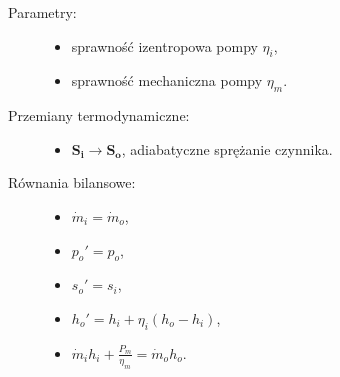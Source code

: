 \begin{description}

	\item[Parametry:] \hfill

		\begin{itemize}

			\item sprawność izentropowa pompy $\eta_i$,

			\item sprawność mechaniczna pompy $\eta_m$.

		\end{itemize}

	\item[Przemiany termodynamiczne:] \hfill

		\begin{itemize}

			\item $\mathbf{S_i} \rightarrow \mathbf{S_o}$,
				adiabatyczne sprężanie czynnika.

		\end{itemize}

	\item[Równania bilansowe:] \hfill

		\begin{itemize}

			\item \eq$\dot m_i = \dot m_o$,

			\item \eq$p_o' = p_o$,%
				\label{pompa.petla.p}

			\item \eq$s_o' = s_i$,%
				\label{pompa.petla.s}

			\item \eq$h_o' = h_i + \eta_i ( h_o - h_i )$,%
				\label{pompa.wyj.h}

			\item \eq$\dot m_i h_i + \frac{P_m}{\eta_m} = \dot m_o h_o$.

		\end{itemize}

\end{description}


